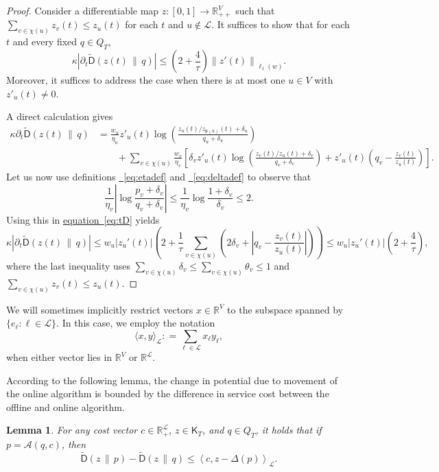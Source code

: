 \documentclass[11pt]{article}
\numberwithin{equation}{section}
\newtheorem{lemma}[theorem]{Lemma}
\theoremstyle{definition}
\theoremstyle{plain}
\newcommand{\R}{\mathbb R}
\newcommand{\expeqref}[2]{\hyperref[#2]{#1~\eqref{#2}}}
\newcommand{\calA}{\mathcal A}
\newcommand{\calL}{\mathcal L}
\newcommand{\dmid}{\,\|\,}
\newcommand{\seteq}{\mathrel{\mathop:}=}
\newcommand{\sfp}{\mathsf{p}}
\newcommand{\sfD}{\mathsf D}
\newcommand{\sfK}{\mathsf K}
\newcommand{\tilD}{\tilde{\sfD}}
\newcommand{\llangle}{\left\langle}
\newcommand{\rrangle}{\right\rangle}
\begin{document}
\begin{proof}
	Consider a differentiable map $z\colon[0,1]\to \R_{++}^V$ such that $\sum_{v\in\chi(u)}z_v(t)\le z_u(t)$ for each $t$ and $u\notin\calL$.
	It suffices to show that for each $t$ and every fixed $q \in Q_T$,
	\[
	\kappa \left|\partial_t \tilD(z(t) \dmid q)\right| \leq \left(2+\frac{4}{\tau}\right) \left\|z'(t)\right\|_{\ell_1(w)}.
	\]
	Moreover, it suffices to address the case when there is at most one $u \in V$ with $z'_u(t) \neq 0$.
	
	A direct calculation gives
	\begin{align}
	\kappa \partial_t \tilD(z(t) \dmid q) &= \frac{w_u}{\eta_u} z'_u(t) \log \left(\frac{z_u(t)/z_{\sfp(u)}(t)+\delta_u}{q_u+\delta_u}\right) \nonumber \\
	&\qquad 
	+ \sum_{v \in \chi(u)} \frac{w_v}{\eta_v} 
	\left[\delta_v z'_u(t) \log \left(\frac{z_v(t)/z_u(t)+\delta_v}{q_v+\delta_v}\right)
	+ z'_u(t) \left(q_v - \frac{z_v(t)}{z_u(t)}\right)
	\right].\label{eq:tD}
	\end{align}
	Let us now use definitions \expeqref{\!}{eq:etadef} and \expeqref{\!}{eq:deltadef}
	to observe that
	\[
	\frac{1}{\eta_v} \left|\log \frac{p_v+\delta_v}{q_v+\delta_v}\right| \leq \frac{1}{\eta_v} \log \frac{1+\delta_v}{\delta_v} \leq 2.
	\]
	Using this in \expeqref{equation}{eq:tD} yields
	\[
	\kappa \left|\partial_t \tilD(z(t) \dmid q)\right| \leq w_u |z_u'(t)| \left(2 + \frac{1}{\tau} \sum_{v \in \chi(u)}
	\left(2\delta_v + \left|q_v-\frac{z_v(t)}{z_u(t)}\right|\right)\right)
	\leq w_u |z_u'(t)| \left(2+\frac{4}{\tau}\right),
	\]
	where the last inequality uses $\sum_{v \in \chi(u)} \delta_v \leq \sum_{v \in \chi(u)} \theta_v \leq 1$ and $\sum_{v\in\chi(u)}z_v(t)\le z_u(t)$.
\end{proof}

We will sometimes implicitly restrict vectors $x \in \R^{V}$ to the subspace spanned by $\{ e_{\ell} : \ell \in \calL \}$.
In this case, we employ the notation
\[
\langle x,y \rangle_{\calL} \seteq \sum_{\ell \in \calL} x_{\ell} y_{\ell},
\]
when either vector lies in $\R^V$ or $\R^{\calL}$.

According to the following lemma, the change in potential due to movement of the online algorithm is bounded by the difference in service cost between the offline and online algorithm.
\begin{lemma}\label{lem:sc}
	For any cost vector $c \in \R_+^{\calL}$, $z \in \sfK_T$, and $q \in Q_T$, it holds that if $p = \calA(q,c)$, then
	\[
	\tilD(z \dmid p) - \tilD(z \dmid q) \leq \llangle c, z - \Delta(p)\rrangle_{\calL}.
	\]
\end{lemma}
\end{document}
